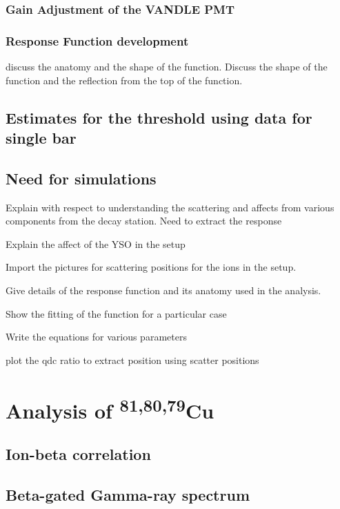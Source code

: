 \documentclass[a4paper,12pt,twoside]{report}
\begin{document}
\subsubsection{Gain Adjustment of the VANDLE PMT}
\subsubsection{Response Function development}

discuss the anatomy and the shape of the function. Discuss the shape of the function and the reflection from the top of the function.
\subsection{Estimates for the threshold using data for single bar}
\subsection{}

\subsection{Need for simulations}
Explain with respect to understanding the scattering and affects from various components from the decay station. Need to extract the response

Explain the affect of the YSO in the setup

Import the pictures for scattering positions for the ions in the setup.

Give details of the response function and its anatomy used in the analysis.

Show the fitting of the function for a particular case

Write the equations for various parameters

plot the qdc ratio to extract position using scatter positions


\section{Analysis of \textsuperscript{81,80,79}Cu}
\subsection{Ion-beta correlation}
\subsection{Beta-gated Gamma-ray spectrum}
\end{document}
